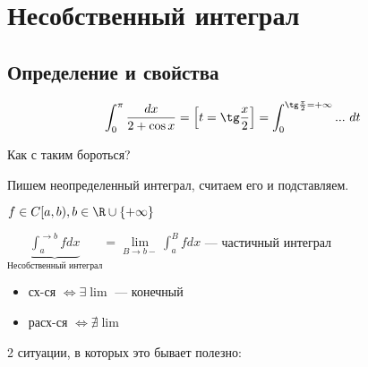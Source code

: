 \newpage

\section{Несобственный интеграл}
\subsection{Определение и свойства}
\begin{motivation}
    \[
        \int_0^\pi \frac{dx}{2 + \cos x} = \left[ t = \tg \frac{x}{2} \right] = \int_0^{\tg \frac{\pi}{2} = +\infty} ... \,\, dt 
    \]

    Как с таким бороться?

    Пишем неопределенный интеграл, считаем его и подставляем.
\end{motivation}

\begin{definition}
    $f \in C[a, b),  b \in \R \cup \{ + \infty \}$

    $\underbrace{\int_a^{\to b} f dx}_{\text{Несобственный интеграл}} = \lim\limits_{B \to b-} \int_a^B f dx$ --- частичный интеграл
\\
\begin{itemize}
    \item сх-ся $\Longleftrightarrow \exists \lim$ --- конечный
    \item расх-ся $\Longleftrightarrow \nexists \lim$
\end{itemize}
    
\end{definition}


2 ситуации, в которых это бывает полезно: \\\\\\



